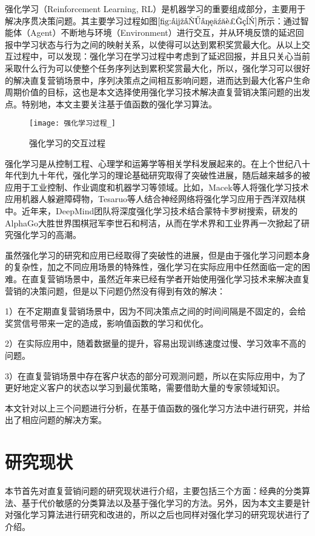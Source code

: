 强化学习（Reinforcement Learning, RL）是机器学习的重要组成部分，主要用于解决序贯决策问题。其主要学习过程如图$\ref{fig:强化学习过程}$所示：通过智能体（Agent）不断地与环境（Environment）进行交互，并从环境反馈的延迟回报中学习状态与行为之间的映射关系，以使得可以达到累积奖赏最大化。从以上交互过程中，可以发现：强化学习在学习过程中考虑到了延迟回报，并且只关心当前采取什么行为可以使整个任务序列达到累积奖赏最大化，所以，强化学习可以很好的解决直复营销场景中，序列决策点之间相互影响问题，进而达到最大化客户生命周期价值的目标，这也是本文选择使用强化学习技术解决直复营销决策问题的出发点。特别地，本文主要关注基于值函数的强化学习算法。
\begin{figure}[htbp]
\centering
\texttt{[image: 强化学习过程\_]}
\caption{强化学习的交互过程}
\label{fig:强化学习过程}
\end{figure}

强化学习是从控制工程、心理学和运筹学等相关学科发展起来的。在上个世纪八十年代到九十年代，强化学习的理论基础研究取得了突破性进展，随后越来越多的被应用于工业控制、作业调度和机器学习等领域。比如，Macek等人将强化学习技术应用机器人躲避障碍物，Tesaruo等人结合神经网络将强化学习应用于西洋双陆棋中。近年来，DeepMind团队将深度强化学习技术结合蒙特卡罗树搜索，研发的AlphaGo大胜世界围棋冠军李世石和柯洁，从而在学术界和工业界再一次掀起了研究强化学习的高潮。

虽然强化学习的研究和应用已经取得了突破性的进展，但是由于强化学习问题本身的复杂性，加之不同应用场景的特殊性，强化学习在实际应用中任然面临一定的困难。在直复营销场景中，虽然近年来已经有学者开始使用强化学习技术来解决直复营销的决策问题，但是以下问题仍然没有得到有效的解决：

1）在不定期直复营销场景中，因为不同决策点之间的时间间隔是不固定的，会给奖赏信号带来一定的造成，影响值函数的学习和优化。

2）在实际应用中，随着数据量的提升，容易出现训练速度过慢、学习效率不高的问题。

3）在直复营销场景中存在客户状态的部分可观测问题，所以在实际应用中，为了更好地定义客户的状态以学习到最优策略，需要借助大量的专家领域知识。

本文针对以上三个问题进行分析，在基于值函数的强化学习方法中进行研究，并给出了相应问题的解决方案。

\section{研究现状}
本节首先对直复营销问题的研究现状进行介绍，主要包括三个方面：经典的分类算法、基于代价敏感的分类算法以及基于强化学习的方法。另外，因为本文主要是针对强化学习算法进行研究和改进的，所以之后也同样对强化学习的研究现状进行了介绍。

